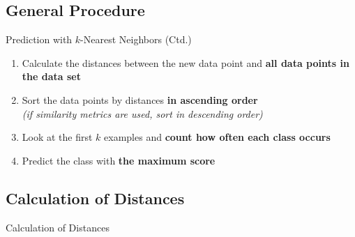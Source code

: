 \subsection{General Procedure}

\begin{frame}{Prediction with $k$-Nearest Neighbors (Ctd.)}{}
	\begin{enumerate}
		\item Calculate the distances between the new data point and \textbf{all data points in the data set}
		\item Sort the data points by distances \textbf{in ascending order} \\
			{\footnotesize \textit{(if similarity metrics are used, sort in descending order)}}
		\item Look at the first $k$ examples and \textbf{count how often each class occurs}
		\item Predict the class with \textbf{the maximum score}
	\end{enumerate}
\end{frame}


\subsection{Calculation of Distances}

\begin{frame}{ Calculation of Distances}{}
\end{frame}


